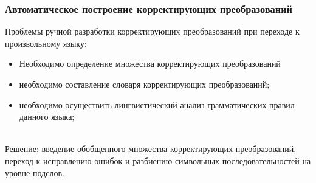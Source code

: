 \documentclass[10pt]{beamer}
\begin{document}
\begin{frame}
\frametitle{Автоматическое построение корректирующих преобразований}

Проблемы ручной разработки корректирующих преобразований при переходе к произвольному языку:

\begin{itemize}
\item Необходимо определение множества корректирующих преобразований
\item необходимо составление словаря корректирующих преобразований;
\item необходимо осуществить лингвистический анализ грамматических правил данного языка;
\end{itemize}
~\\
Решение: введение обобщенного множества корректирующих преобразований, переход к исправлению ошибок и разбиению символьных последовательностей на уровне подслов.

\end{frame}






\end{document}
